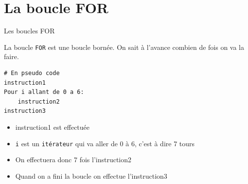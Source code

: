 \def\level{Première}  %
\def\course{NSI}
\def\chaptername{Boucles FOR et WHILE} %
\def\docname{AP04}        %

\pagestyle{cours_FP}
\makeheader{} %

\section{La boucle FOR}

\begin{easybox}{Les boucles FOR}{}

	La boucle \verb+FOR+ est une boucle bornée. On sait à l'avance combien de fois on va la faire.

\medskip

	\begin{minipage}{0.35\linewidth}
	\begin{lstlisting}[numbers=none]
# En pseudo code
instruction1
Pour i allant de 0 a 6:
	instruction2
instruction3
	\end{lstlisting}
		\end{minipage}\hfill
		\begin{minipage}{0.63\linewidth}
	\begin{itemize}
		\item instruction1 est effectuée
		\item \verb+i+ est un \verb+itérateur+ qui va aller de 0 à 6, c'est à dire 7 tours
		\item On effectuera donc 7 fois l'instruction2 
		\item Quand on a fini la boucle on effectue l'instruction3
	\end{itemize}
		\end{minipage}	
	\end{easybox}
	
